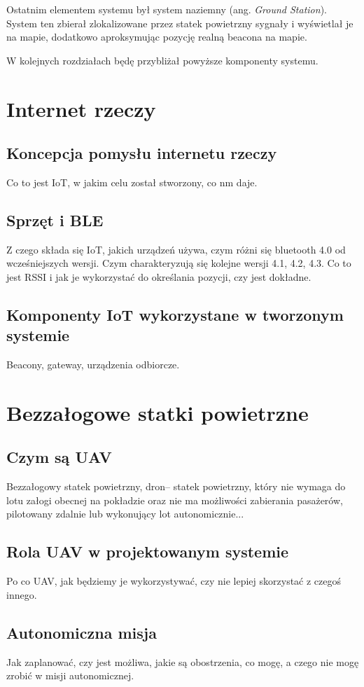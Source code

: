Ostatnim elementem systemu był system naziemny (ang. \textit{Ground Station}). System ten zbierał zlokalizowane przez statek powietrzny sygnały i wyświetlał je na mapie, dodatkowo aproksymując pozycję realną beacona na mapie.

W kolejnych rozdziałach będę przybliżał powyższe komponenty systemu.

\section{Internet rzeczy}
\subsection{Koncepcja pomysłu internetu rzeczy}
Co to jest IoT, w jakim celu został stworzony, co nm daje.
\subsection{Sprzęt i BLE}
Z czego składa się IoT, jakich urządzeń używa, czym różni się bluetooth 4.0 od wcześniejszych wersji. Czym charakteryzują się kolejne wersji 4.1, 4.2, 4.3. Co to jest RSSI i jak je wykorzystać do określania pozycji, czy jest dokładne.
\subsection{Komponenty IoT wykorzystane w tworzonym systemie}
Beacony, gateway, urządzenia odbiorcze.

\section{Bezzałogowe statki powietrzne}
\subsection{Czym są UAV}
Bezzałogowy statek powietrzny, dron– statek powietrzny, który nie wymaga do lotu załogi obecnej na pokładzie oraz nie ma możliwości zabierania pasażerów, pilotowany zdalnie lub wykonujący lot autonomicznie...
\subsection{Rola UAV w projektowanym systemie}
Po co UAV, jak będziemy je wykorzystywać, czy nie lepiej skorzystać z czegoś innego.
\subsection{Autonomiczna misja}
Jak zaplanować, czy jest możliwa, jakie są obostrzenia, co mogę, a czego nie mogę zrobić w misji autonomicznej.
